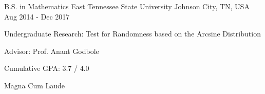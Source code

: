 

\begin{cventries}

  \cventry
    {B.S. in Mathematics} %
    {East Tennessee State University} %
    {Johnson City, TN, USA} %
    {Aug 2014 - Dec 2017} %
    {
    \begin{cvitems}
    \item Undergraduate Research: Test for Randomness based on the Arcsine Distribution
    \item Advisor: Prof. Anant Godbole
    \item Cumulative GPA: 3.7 / 4.0
    \item Magna Cum Laude
    \end{cvitems}
    }


\end{cventries}
